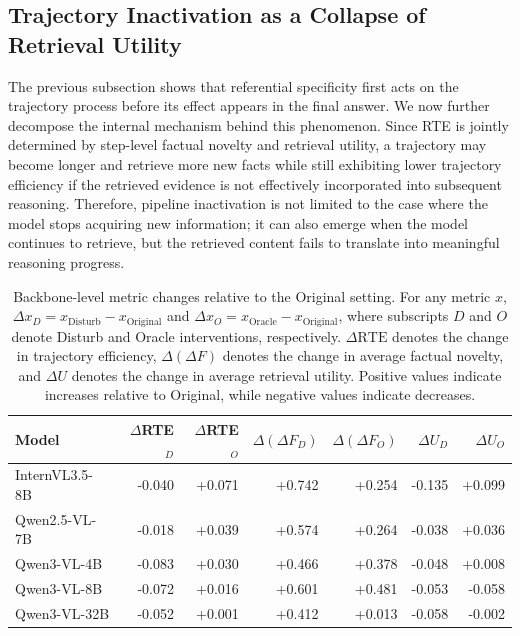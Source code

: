 \documentclass{article} %
\begin{document}
\subsection{Trajectory Inactivation as a Collapse of Retrieval Utility}
The previous subsection shows that referential specificity first acts on the trajectory process before its effect appears in the final answer. We now further decompose the internal mechanism behind this phenomenon. Since RTE is jointly determined by step-level factual novelty and retrieval utility, a trajectory may become longer and retrieve more new facts while still exhibiting lower trajectory efficiency if the retrieved evidence is not effectively incorporated into subsequent reasoning. Therefore, pipeline inactivation is not limited to the case where the model stops acquiring new information; it can also emerge when the model continues to retrieve, but the retrieved content fails to translate into meaningful reasoning progress.

\begin{table}[htbp]
\centering
\small
\setlength{\tabcolsep}{4pt}
\renewcommand{\arraystretch}{1.08}
\caption{
Backbone-level metric changes relative to the Original setting.
For any metric $x$, $\Delta x_D=x_{\mathrm{Disturb}}-x_{\mathrm{Original}}$ and $\Delta x_O=x_{\mathrm{Oracle}}-x_{\mathrm{Original}}$, where subscripts $D$ and $O$ denote Disturb and Oracle interventions, respectively.
$\Delta\mathrm{RTE}$ denotes the change in trajectory efficiency, $\Delta(\Delta F)$ denotes the change in average factual novelty, and $\Delta U$ denotes the change in average retrieval utility.
Positive values indicate increases relative to Original, while negative values indicate decreases.
}
\label{tab:mechanism_backbone_delta}
\begin{tabular}{lrrrrrr}
\toprule
\textbf{Model} &
\textbf{$\Delta$RTE$_D$} &
\textbf{$\Delta$RTE$_O$} &
\textbf{$\Delta(\Delta F_D)$} &
\textbf{$\Delta(\Delta F_O)$} &
\textbf{$\Delta U_D$} &
\textbf{$\Delta U_O$} \\
\midrule
InternVL3.5-8B   & -0.040 & +0.071 & +0.742 & +0.254 & -0.135 & +0.099 \\
Qwen2.5-VL-7B    & -0.018 & +0.039 & +0.574 & +0.264 & -0.038 & +0.036 \\
Qwen3-VL-4B      & -0.083 & +0.030 & +0.466 & +0.378 & -0.048 & +0.008 \\
Qwen3-VL-8B      & -0.072 & +0.016 & +0.601 & +0.481 & -0.053 & -0.058 \\
Qwen3-VL-32B     & -0.052 & +0.001 & +0.412 & +0.013 & -0.058 & -0.002 \\
\bottomrule
\end{tabular}
\end{table}
\end{document}
